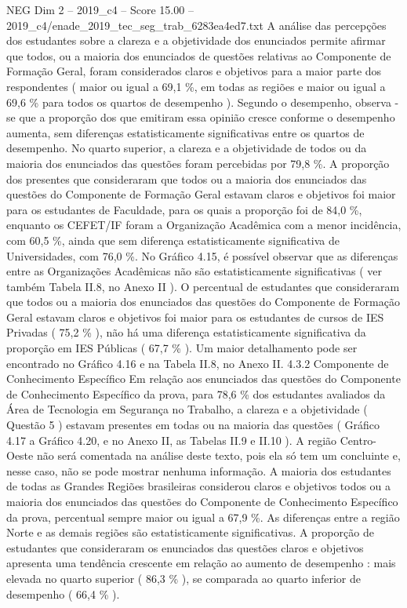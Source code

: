 \begin{textsample}{NEG Dim 2 – 2019\_c4 – Score 15.00 – 2019\_c4/enade\_2019\_tec\_seg\_trab\_6283ea4ed7.txt}
A análise das percepções dos estudantes sobre a clareza e a objetividade dos enunciados permite afirmar que todos, ou a maioria dos enunciados de questões relativas ao Componente de Formação Geral, foram considerados claros e objetivos para a maior parte dos respondentes ( maior ou igual a 69,1 \%, em todas as regiões e maior ou igual a 69,6 \% para todos os quartos de desempenho ).
Segundo o desempenho, observa -se que a proporção dos que emitiram essa opinião cresce conforme o desempenho aumenta, sem diferenças estatisticamente significativas entre os quartos de desempenho.
No quarto superior, a clareza e a objetividade de todos ou da maioria dos enunciados das questões foram percebidas por 79,8 \%.
A proporção dos presentes que consideraram que todos ou a maioria dos enunciados das questões do Componente de Formação Geral estavam claros e objetivos foi maior para os estudantes de Faculdade, para os quais a proporção foi de 84,0 \%, enquanto os CEFET/IF foram a Organização Acadêmica com a menor incidência, com 60,5 \%, ainda que sem diferença estatisticamente significativa de Universidades, com 76,0 \%.
No Gráfico 4.15, é possível observar que as diferenças entre as Organizações Acadêmicas não são estatisticamente significativas ( ver também Tabela II.8, no Anexo II ).
O percentual de estudantes que consideraram que todos ou a maioria dos enunciados das questões do Componente de Formação Geral estavam claros e objetivos foi maior para os estudantes de cursos de IES Privadas ( 75,2 \% ), não há uma diferença estatisticamente significativa da proporção em IES Públicas ( 67,7 \% ).
Um maior detalhamento pode ser encontrado no Gráfico 4.16 e na Tabela II.8, no Anexo II. 4.3.2 Componente de Conhecimento Específico Em relação aos enunciados das questões do Componente de Conhecimento Específico da prova, para 78,6 \% dos estudantes avaliados da Área de Tecnologia em Segurança no Trabalho, a clareza e a objetividade ( Questão 5 ) estavam presentes em todas ou na maioria das questões ( Gráfico 4.17 a Gráfico 4.20, e no Anexo II, as Tabelas II.9 e II.10 ).
A região Centro-Oeste não será comentada na análise deste texto, pois ela só tem um concluinte e, nesse caso, não se pode mostrar nenhuma informação.
A maioria dos estudantes de todas as Grandes Regiões brasileiras considerou claros e objetivos todos ou a maioria dos enunciados das questões do Componente de Conhecimento Específico da prova, percentual sempre maior ou igual a 67,9 \%.
As diferenças entre a região Norte e as demais regiões são estatisticamente significativas.
A proporção de estudantes que consideraram os enunciados das questões claros e objetivos apresenta uma tendência crescente em relação ao aumento de desempenho : mais elevada no quarto superior ( 86,3 \% ), se comparada ao quarto inferior de desempenho ( 66,4 \% ).

\end{textsample}
